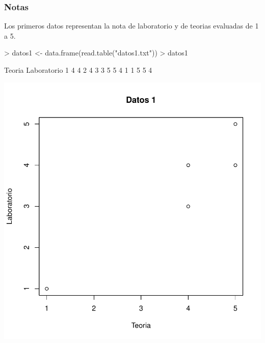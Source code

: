 \documentclass [a4paper] {article}
\begin{document}
\subsubsection{Notas}
Los primeros datos representan la nota de laboratorio y de teorias evaluadas de 1 a 5.
\begin{Schunk}
\begin{Sinput}
> datos1 <- data.frame(read.table("datos1.txt"))
> datos1
\end{Sinput}
\begin{Soutput}
  Teoria Laboratorio
1      4           4
2      4           3
3      5           5
4      1           1
5      5           4
\end{Soutput}
\end{Schunk}
\begin{center}
\includegraphics{entrega-plot_datos1}
\end{center}

\newpage
\end{document}
